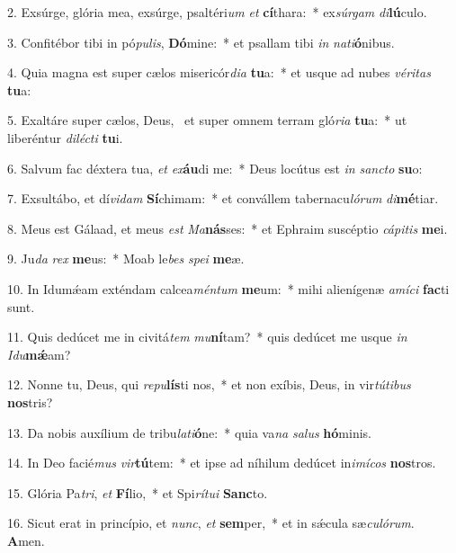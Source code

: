 2. Exsúrge, glória mea, exsúrge, psaltéri\textit{um} \textit{et} \textbf{cí}thara:~*  ex\textit{súr}\textit{gam} \textit{di}\textbf{lú}culo.\

3. Confitébor tibi in pó\textit{pu}\textit{lis}, \textbf{Dó}mine:~*  et psallam tibi \textit{in} \textit{na}\textit{ti}\textbf{ó}nibus.\

4. Quia magna est super cælos misericór\textit{di}\textit{a} \textbf{tu}a:~*  et usque ad nubes \textit{vé}\textit{ri}\textit{tas} \textbf{tu}a:\

5. Exaltáre super cælos, Deus, \dag\  et super omnem terram gló\textit{ri}\textit{a} \textbf{tu}a:~*  ut liberéntur \textit{di}\textit{léc}\textit{ti} \textbf{tu}i.\

6. Salvum fac déxtera tua, \textit{et} \textit{ex}\textbf{áu}di me:~*  Deus locútus est \textit{in} \textit{sanc}\textit{to} \textbf{su}o:\

7. Exsultábo, et dí\textit{vi}\textit{dam} \textbf{Sí}chimam:~*  et convállem tabernacu\textit{ló}\textit{rum} \textit{di}\textbf{mé}tiar.\

8. Meus est Gálaad, et meus \textit{est} \textit{Ma}\textbf{nás}ses:~*  et Ephraim suscéptio \textit{cá}\textit{pi}\textit{tis} \textbf{me}i.\

9. Ju\textit{da} \textit{rex} \textbf{me}us:~*  Moab le\textit{bes} \textit{spe}\textit{i} \textbf{me}æ.\

10. In Idumǽam exténdam calcea\textit{mén}\textit{tum} \textbf{me}um:~*  mihi alienígenæ \textit{a}\textit{mí}\textit{ci} \textbf{fac}ti sunt.\

11. Quis dedúcet me in civitá\textit{tem} \textit{mu}\textbf{ní}tam?~*  quis dedúcet me usque \textit{in} \textit{I}\textit{du}\textbf{mǽ}am?\

12. Nonne tu, Deus, qui \textit{re}\textit{pu}\textbf{lís}ti nos,~*  et non exíbis, Deus, in vir\textit{tú}\textit{ti}\textit{bus} \textbf{nos}tris?\

13. Da nobis auxílium de tribu\textit{la}\textit{ti}\textbf{ó}ne:~*  quia va\textit{na} \textit{sa}\textit{lus} \textbf{hó}minis.\

14. In Deo facié\textit{mus} \textit{vir}\textbf{tú}tem:~*  et ipse ad níhilum dedúcet in\textit{i}\textit{mí}\textit{cos} \textbf{nos}tros.\

15. Glória Pa\textit{tri}, \textit{et} \textbf{Fí}lio,~*  et Spi\textit{rí}\textit{tu}\textit{i} \textbf{Sanc}to.\

16. Sicut erat in princípio, et \textit{nunc}, \textit{et} \textbf{sem}per,~*  et in sǽcula sæ\textit{cu}\textit{ló}\textit{rum}. \textbf{A}men.\

